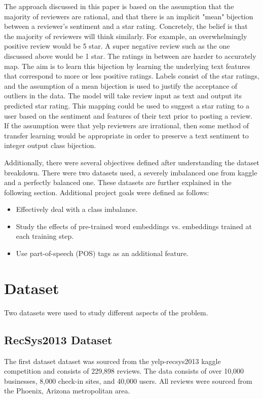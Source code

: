 \par 
The approach discussed in this paper is based on the assumption that the majority of reviewers are rational, and that there is an implicit "mean" bijection between a reviewer's sentiment and a star rating. Concretely, the belief is that the majority of reviewers will think similarly. For example, an overwhelmingly positive review would be 5 star. A super negative review such as the one discussed above would be 1 star. The ratings in between are harder to accurately map. The aim is to learn this bijection by learning the underlying text features that correspond to more or less positive ratings. Labels consist of the star ratings, and the assumption of a mean bijection is used to justify the acceptance of outliers in the data. The model will take review input as text and output its predicted star rating. This mapping could be used to suggest a star rating to a user based on the sentiment and features of their text prior to posting a review. If the assumption were that yelp reviewers are irrational, then some method of transfer learning would be appropriate in order to preserve a text sentiment to integer output class bijection.

\par 
Additionally, there were several objectives defined after understanding the dataset breakdown. There were two datasets used, a severely imbalanced one from kaggle and a perfectly balanced one. 
These datasets are further explained in the following section. Additional project goals were defined as follows:
\begin{itemize}
	\item Effectively deal with a class imbalance.
	\item Study the effects of pre-trained word embeddings vs. embeddings trained at each training step.
	\item Use part-of-speech (POS) tags as an additional feature.
\end{itemize}

\section{Dataset}
Two datasets were used to study different aspects of the problem. 
\subsection{RecSys2013 Dataset}
The first dataset dataset was sourced from the yelp-recsys2013 kaggle competition \cite{kaggle} and consists of 229,898 reviews. The data consists of over 10,000 businesses, 8,000 check-in sites, and 40,000 users. All reviews were sourced from the Phoenix, Arizona metropolitan area.

